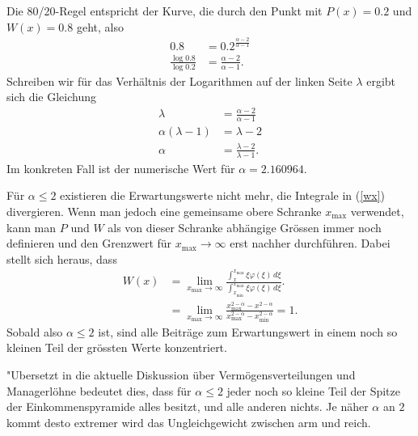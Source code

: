 Die 80/20-Regel entspricht der Kurve, die durch den 
Punkt mit $P(x)=0.2$ und $W(x)=0.8$ geht, also
\begin{align*}
0.8&=0.2^{\frac{\alpha-2}{\alpha-1}}
\\
\frac{\log 0.8}{\log 0.2}
&=
\frac{\alpha-2}{\alpha-1}.
\end{align*}
Schreiben wir für das Verhältnis der Logarithmen auf der linken
Seite $\lambda$ ergibt sich die Gleichung
\begin{align*}
\lambda
&=
\frac{\alpha-2}{\alpha-1}
\\
\alpha(\lambda-1)&=\lambda-2
\\
\alpha&=\frac{\lambda-2}{\lambda-1}.
\end{align*}
Im konkreten Fall ist der numerische Wert für $\alpha=2.160964$.

Für $\alpha\le 2$ existieren die Erwartungswerte nicht mehr, die
Integrale in (\ref{wx}) divergieren.
Wenn man jedoch
eine gemeinsame obere Schranke $x_{\max}$ verwendet, kann man $P$
und $W$ als von dieser Schranke abhängige Grössen immer noch
definieren und den Grenzwert für $x_{\max}\to\infty$ erst nachher
durchführen.
Dabei stellt sich heraus, dass
\begin{align*}
W(x)
&=
\lim_{x_{\max}\to\infty}
\frac%
{\int_x^{x_{\max}} \xi\varphi(\xi)\,d\xi}%
{\int_{x_{\min}}^{x_{\max}} \xi\varphi(\xi)\,d\xi}.
\\
&=
\lim_{x_{\max}\to\infty}
\frac%
{x_{\max}^{2-\alpha}-x^{2-\alpha}}%
{x_{\max}^{2-\alpha}-x_{\min}^{2-\alpha}}
=1.
\end{align*}
Sobald also $\alpha\le2$ ist, sind alle Beiträge zum Erwartungswert
in einem noch so kleinen Teil der grössten Werte konzentriert.

"Ubersetzt in die aktuelle Diskussion über Vermögensverteilungen
und Managerlöhne bedeutet dies, dass für $\alpha\le2$ jeder noch so
kleine Teil der Spitze der Einkommenspyramide alles besitzt, und alle
anderen nichts.
Je näher $\alpha$ an $2$ kommt desto extremer wird
das Ungleichgewicht zwischen arm und reich.

